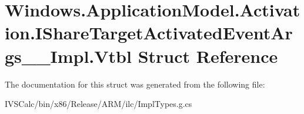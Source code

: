 \hypertarget{struct_windows_1_1_application_model_1_1_activation_1_1_i_share_target_activated_event_args_____impl_1_1_vtbl}{}\section{Windows.\+Application\+Model.\+Activation.\+I\+Share\+Target\+Activated\+Event\+Args\+\_\+\+\_\+\+Impl.\+Vtbl Struct Reference}
\label{struct_windows_1_1_application_model_1_1_activation_1_1_i_share_target_activated_event_args_____impl_1_1_vtbl}


The documentation for this struct was generated from the following file\+:\begin{DoxyCompactItemize}
\item 
I\+V\+S\+Calc/bin/x86/\+Release/\+A\+R\+M/ilc/Impl\+Types.\+g.\+cs\end{DoxyCompactItemize}
